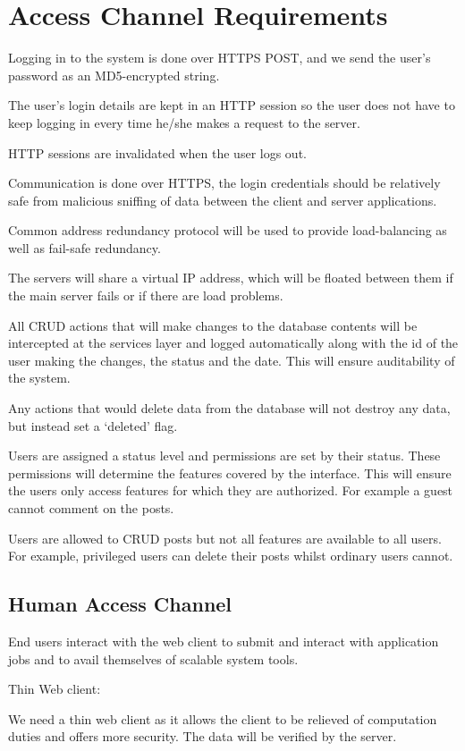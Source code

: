 \documentclass[a4paper,12pt]{report}
\begin{document}
\section{Access Channel Requirements}
\begin{description}
\item Logging in to the system is done over HTTPS POST, and  we send the user's password as an MD5-encrypted string. 
\item The user's login details are kept in an HTTP session so the user does not have to keep logging in every time he/she makes a request to the server. 
\item HTTP sessions are invalidated when the user logs out.
\item Communication is done over HTTPS, the login credentials should be relatively safe from malicious sniffing of data between the client and server applications.
\item Common address redundancy protocol will be used to provide load-balancing as well as fail-safe redundancy. 
\item The servers will share a virtual IP address, which will be floated between them if the main server fails or if there are load problems.
\item All CRUD actions that will make changes to the database contents will be intercepted at the services layer and logged automatically along with the id of the user making the changes, the status and the date. This will ensure auditability of the system. 
\item Any actions that would delete data from the database will not destroy any data, but instead set a `deleted' flag.
\item Users are assigned a status level and permissions are set by their status. These permissions will determine the features covered by the interface. This will ensure the users only access features for which they are authorized. For example a guest cannot comment on the posts. 
\item Users are allowed to CRUD posts but not all features are available to all users. For example, privileged users can delete their posts whilst ordinary users cannot.
\end{description}

\subsection{Human Access Channel}
	\begin{description}
\item End users interact with the web client to submit and interact with application jobs and to avail themselves of scalable system tools.
\item Thin Web client:
\item We need a thin web client as it allows the client to be relieved of computation duties and offers more security. The data will be verified by the server.
\end{description}
\end{document}
